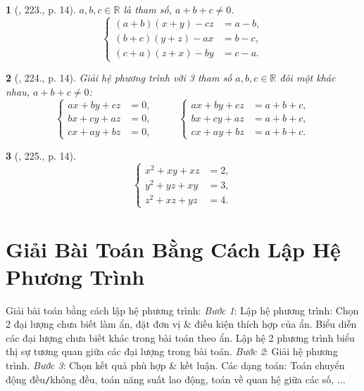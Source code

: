 \documentclass{article}
\newtheorem{baitoan}{}
\begin{document}
\begin{baitoan}[\cite{Binh_Toan_9_tap_2}, 223., p. 14]
	$a,b,c\in\mathbb{R}$ là tham số, $a + b + c\ne0$.
	\begin{equation*}
		\left\{\begin{split}
			(a + b)(x + y) - cz &= a - b,\\
			(b + c)(y + z) - ax &= b - c,\\
			(c + a)(z + x) - by &= c - a.
		\end{split}\right.
	\end{equation*}
\end{baitoan}

\begin{baitoan}[\cite{Binh_Toan_9_tap_2}, 224., p. 14]
	Giải hệ phương trình với 3 tham số $a,b,c\in\mathbb{R}$ đôi một khác nhau, $a + b + c\ne0$:
	\begin{equation*}
		\left\{\begin{split}
			ax + by + cz &= 0,\\
			bx + cy + az &= 0,\\
			cx + ay + bz &= 0,
		\end{split}\right.\hspace{1cm}\left\{\begin{split}
			ax + by + cz &= a + b + c,\\
			bx + cy + az &= a + b + c,\\
			cx + ay + bz &= a + b + c.
		\end{split}\right.
	\end{equation*}
\end{baitoan}

\begin{baitoan}[\cite{Binh_Toan_9_tap_2}, 225., p. 14]
	\begin{equation*}
		\left\{\begin{split}
			x^2 + xy + xz &= 2,\\
			y^2 + yz + xy &= 3,\\
			z^2 + xz + yz &= 4.
		\end{split}\right.
	\end{equation*}
\end{baitoan}


\section{Giải Bài Toán Bằng Cách Lập Hệ Phương Trình}
 {\sf Giải bài toán bằng cách lập hệ phương trình:} \textit{Bước 1}: Lập hệ phương trình: Chọn 2 đại lượng chưa biết làm ẩn, đặt đơn vị \& điều kiện thích hợp của ẩn. Biểu diễn các đại lượng chưa biết khác trong bài toán theo ẩn. Lập hệ 2 phương trình biểu thị sự tương quan giữa các đại lượng trong bài toán. \textit{Bước 2}: Giải hệ phương trình. \textit{Bước 3}: Chọn kết quả phù hợp \& kết luận.  Các dạng toán: Toán chuyển động đều{\tt/}không đều, toán năng suất lao động, toán về quan hệ giữa các số, $\ldots$
\end{document}
